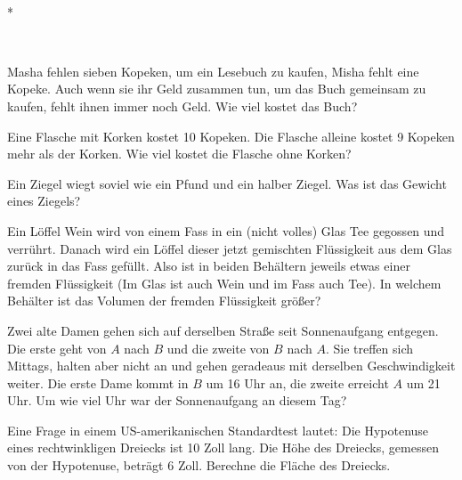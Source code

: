 \documentclass[12pt]{article} %
\begin{document}
\ 

\vspace{0pt plus 12pt}
\centerline{*\quad *\quad*}
\vspace{.4\baselineskip}

\

{} Masha fehlen sieben Kopeken, um ein Lesebuch zu kaufen, Misha fehlt eine Kopeke. Auch wenn sie ihr Geld zusammen tun, um das Buch gemeinsam zu kaufen, fehlt ihnen immer noch Geld. Wie viel kostet das Buch? 
\newline\newline\quad


 Eine Flasche mit Korken kostet 10 Kopeken. Die Flasche alleine kostet 9 Kopeken mehr als der Korken. Wie viel kostet die Flasche ohne Korken?
\newline\newline{}\quad


 Ein Ziegel wiegt soviel wie ein Pfund und ein halber Ziegel. Was ist das Gewicht eines Ziegels? 
\newline\newline\quad


 Ein Löffel Wein wird von einem Fass in ein (nicht volles) Glas Tee gegossen und verrührt. Danach wird ein Löffel dieser jetzt gemischten Flüssigkeit aus dem Glas zurück in das Fass gefüllt. Also ist in beiden Behältern jeweils etwas einer fremden Flüssigkeit (Im Glas ist auch Wein und im Fass auch Tee). In welchem Behälter ist das Volumen der fremden Flüssigkeit größer?
\newline\newline\quad


 Zwei alte Damen gehen sich auf derselben Straße seit Sonnenaufgang entgegen. Die erste geht von $A$ nach $B$ und die zweite von $B$ nach $A$. Sie treffen sich Mittags, halten aber nicht an und gehen geradeaus mit derselben Geschwindigkeit weiter. Die erste Dame kommt in $B$ um 16 Uhr an, die zweite erreicht $A$ um 21 Uhr. Um wie viel Uhr war der Sonnenaufgang an diesem Tag?
\newline\newline\quad


 Eine Frage in einem US-amerikanischen Standardtest lautet: Die Hypotenuse eines rechtwinkligen Dreiecks ist  10 Zoll lang. Die Höhe des Dreiecks, gemessen von der Hypotenuse, beträgt 6 Zoll. Berechne die Fläche des Dreiecks.

\end{document}
